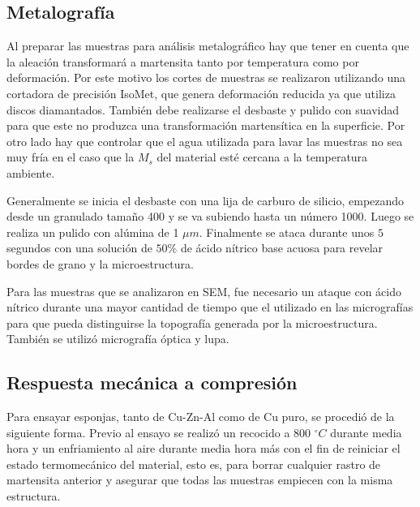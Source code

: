 \documentclass[a4paper,12pt,fleqn,twoside,openany]{book}
\begin{document}
\subsection{Metalografía}

Al preparar las muestras para análisis metalográfico hay que tener en cuenta que la aleación transformará a martensita tanto por temperatura como por deformación. Por este motivo los cortes de muestras se realizaron utilizando una cortadora de precisión IsoMet, que genera deformación reducida ya que utiliza discos diamantados. También debe realizarse el desbaste y pulido con suavidad para que este no produzca una transformación 
martensítica en la superficie. Por otro lado hay que controlar que el agua utilizada para lavar las muestras no sea muy fría en el caso 
que la $M_s$ del material esté cercana a la temperatura ambiente. 

Generalmente se inicia el desbaste con una lija de carburo de silicio, empezando desde un granulado tamaño 400 y se va subiendo hasta un número 1000. 
Luego se realiza un pulido con alúmina de 1 $\mu m$. Finalmente se ataca durante unos $5$ segundos con una solución de $50 \% $ de ácido nítrico base acuosa para revelar bordes de grano y la microestructura. 

Para las muestras que se analizaron en SEM, fue necesario un ataque con ácido nítrico durante una mayor cantidad de tiempo que el utilizado en las micrografías para que pueda distinguirse la topografía generada por la microestructura. También se utilizó micrografía óptica y lupa. 

\subsection{Respuesta mecánica a compresión} \label{compresión}



Para ensayar esponjas, tanto de Cu-Zn-Al como de Cu puro, se procedió de la siguiente forma. Previo al ensayo se realizó un recocido a 800 $^\circ C$ durante media hora y un enfriamiento al aire durante media hora más con el fin de reiniciar el estado termomecánico del material, esto es, para borrar cualquier rastro de martensita anterior y asegurar que todas las muestras empiecen con la misma estructura. 
\end{document}
